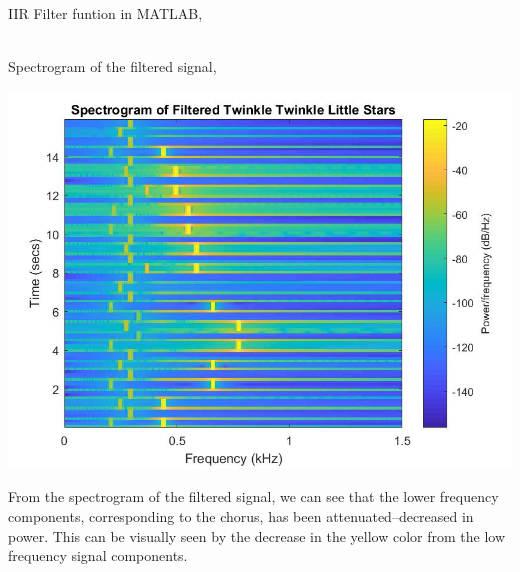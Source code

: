 \documentclass{article}
\begin{document}
        IIR Filter funtion in MATLAB,
        
        \vspace{5mm}\\
        Spectrogram of the filtered signal,
        \begin{center}
            \includegraphics[width=\textwidth]{task5spectro.jpg}
        \end{center}
        From the spectrogram of the filtered signal, we can see that the lower frequency components, corresponding to the chorus, has been attenuated--decreased in power. This can be visually seen by the decrease in the yellow color from the low frequency signal components.
        
\end{document}
